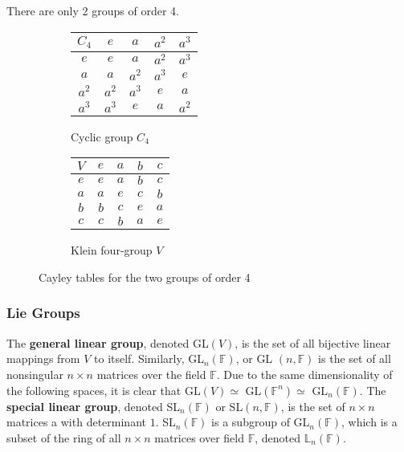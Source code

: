  \begin{example}
    There are only 2 groups of order 4. 
    \begin{figure}[H]
      \centering
      \begin{subfigure}[b]{0.48\textwidth}
        \centering
        \begin{tabular}{|c|c|c|c|c|}
          \hline
          $C_4$ & $e$ & $a$ & $a^2$ & $a^3$ \\
          \hline
          $e$ & $e$ & $a$ & $a^2$ & $a^3$ \\
          \hline
          $a$ & $a$ & $a^2$ & $a^3$ & $e$ \\
          \hline
          $a^2$ & $a^2$ & $a^3$ & $e$ & $a$ \\
          \hline
          $a^3$ & $a^3$ & $e$ & $a$ & $a^2$ \\
          \hline
        \end{tabular}
        \caption{Cyclic group $C_4$}
      \end{subfigure}
      \hfill 
      \begin{subfigure}[b]{0.48\textwidth}
        \centering
        \begin{tabular}{|c|c|c|c|c|}
          \hline
          $V$ & $e$ & $a$ & $b$ & $c$ \\
          \hline
          $e$ & $e$ & $a$ & $b$ & $c$ \\
          \hline
          $a$ & $a$ & $e$ & $c$ & $b$ \\
          \hline
          $b$ & $b$ & $c$ & $e$ & $a$ \\
          \hline
          $c$ & $c$ & $b$ & $a$ & $e$ \\
          \hline
        \end{tabular}
        \caption{Klein four-group $V$}
      \end{subfigure}
      \caption{Cayley tables for the two groups of order 4}
      \label{fig:order4groups}
    \end{figure} 
  \end{example}

\subsubsection{Lie Groups} 

  \begin{definition}
    The \textbf{general linear group}, denoted GL$(V)$, is the set of all bijective linear mappings from $V$ to itself. Similarly, GL$_{n}(\mathbb{F})$, or GL $(n, \mathbb{F})$ is the set of all nonsingular $n \times n$ matrices over the field $\mathbb{F}$. Due to the same dimensionality of the following spaces, it is clear that GL$(V) \simeq$ GL$(\mathbb{F}^{n}) \simeq$ GL$_{n}(\mathbb{F})$. The \textbf{special linear group}, denoted SL$_{n} (\mathbb{F})$ or SL$(n, \mathbb{F})$, is the set of $n\times n$ matrices a with determinant $1$. SL$_{n}(\mathbb{F})$ is a subgroup of GL$_{n}(\mathbb{F})$, which is a subset of the ring of all $n \times n$ matrices over field $\mathbb{F}$, denoted $\mathbb{L}_{n}(\mathbb{F})$. 
  \end{definition}

